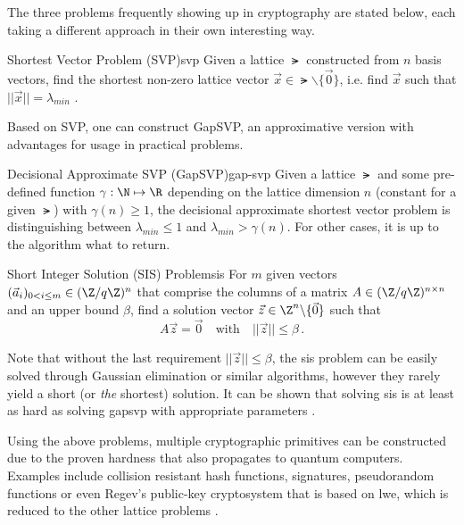 The three problems frequently showing up in cryptography are stated below, each taking a different approach in their own interesting way.

\begin{definition}{Shortest Vector Problem (SVP)}{svp}
  Given a lattice $\lat$ constructed from $n$ basis vectors, find the shortest non-zero lattice vector $\vec{x} \in \lat \backslash \{\vec{0}\}$, i.e. find $\vec{x}$ such that $||\vec{x}|| = \lambda_{min}$ \parencite{2016-decade-of-lattice}.
\end{definition}

Based on SVP, one can construct GapSVP, an approximative version with advantages for usage in practical problems.

\begin{definition}{Decisional Approximate SVP (GapSVP)}{gap-svp}
  Given a lattice $\lat$ and some pre-defined function $\gamma: \N \mapsto \R$ depending on the lattice dimension $n$ (constant for a given $\lat$) with $\gamma(n) \geq 1$, the decisional approximate shortest vector problem is distinguishing between $\lambda_{min} \leq 1$ and $\lambda_{min} > \gamma(n)$.
  For other cases, it is up to the algorithm what to return.
\end{definition}

\begin{definition}{Short Integer Solution (SIS) Problem}{sis}
  For $m$ given vectors $(\vec{a}_i)_{0 < i \leq m} \in (\Z / q\Z)^n$ that comprise the columns of a matrix
  $A \in (\Z / q\Z)^{n \times n}$ and an upper bound $\beta$, find
  a solution vector $\vec{z} \in \Z^n \backslash \{\vec{0}\}$ such that
  $$A \vec{z} = \vec{0} \quad \mathrm{with} \quad ||\vec{z}|| \leq \beta\,.$$
\end{definition}

Note that without the last requirement $||\vec{z}|| \leq \beta$, the \gls{sis} problem can be easily solved through Gaussian elimination or similar algorithms, however they rarely yield a short (or \textit{the} shortest) solution.
It can be shown that solving \gls{sis} is at least as hard as solving \gls{gapsvp} with appropriate parameters \parencite{1996-hard-lattice-problems}.

Using the above problems, multiple cryptographic primitives can be constructed due to the proven hardness that also propagates to quantum computers.
Examples include collision resistant hash functions, signatures, pseudorandom functions or even Regev's public-key cryptosystem that is based on \gls{lwe}, which is reduced to the other lattice problems \parencite{2016-decade-of-lattice}.

